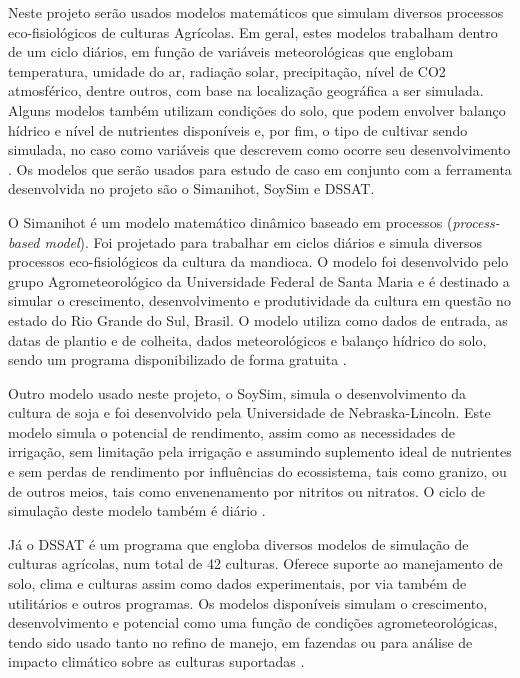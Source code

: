 \documentclass[tg]{mdtufsm}
\begin{document}
        	Neste projeto serão usados modelos matemáticos que simulam diversos processos eco-fisiológicos de culturas Agrícolas. Em geral, estes modelos trabalham dentro de um ciclo diários, em função de variáveis meteorológicas que englobam temperatura, umidade do ar, radiação solar, precipitação, nível de CO2 atmosférico, dentre outros, com base na localização geográfica a ser simulada. Alguns modelos também utilizam condições do solo, que podem envolver balanço hídrico e nível de nutrientes disponíveis e, por fim, o tipo de cultivar sendo simulada, no caso como variáveis que descrevem como ocorre seu desenvolvimento \cite{simanihotArt}. Os modelos que serão usados para estudo de caso em conjunto com a ferramenta desenvolvida no projeto são o Simanihot, SoySim e DSSAT.

        	O Simanihot é um modelo matemático dinâmico baseado em processos (\emph{process-based model}). Foi projetado para trabalhar em ciclos diários e simula diversos processos eco-fisiológicos da cultura da mandioca. O modelo foi desenvolvido pelo grupo Agrometeorológico da Universidade Federal de Santa Maria e é destinado a simular o crescimento, desenvolvimento e produtividade da cultura em questão no estado do Rio Grande do Sul, Brasil. O modelo utiliza como dados de entrada, as datas de plantio e de colheita, dados meteorológicos e balanço hídrico do solo, sendo um programa disponibilizado de forma gratuita \cite{Simanihot}.

        	Outro modelo usado neste projeto, o SoySim, simula o desenvolvimento da cultura de soja e foi desenvolvido pela Universidade de Nebraska-Lincoln. Este modelo simula o potencial de rendimento, assim como as necessidades de irrigação, sem limitação pela irrigação e assumindo suplemento ideal de nutrientes e sem perdas de rendimento por influências do ecossistema, tais como granizo, ou de outros meios, tais como envenenamento por nitritos ou nitratos. O ciclo de simulação deste modelo também é diário \cite{SoySim}.

        	Já o DSSAT é um programa que engloba diversos modelos de simulação de culturas agrícolas, num total de 42 culturas. Oferece suporte ao manejamento de solo, clima e culturas assim como dados experimentais, por via também de utilitários e outros programas. Os modelos disponíveis simulam o crescimento, desenvolvimento e potencial como uma função de condições agrometeorológicas, tendo sido usado tanto no refino de manejo, em fazendas ou para análise de impacto climático sobre as culturas suportadas \cite{dssat}.
\end{document}
